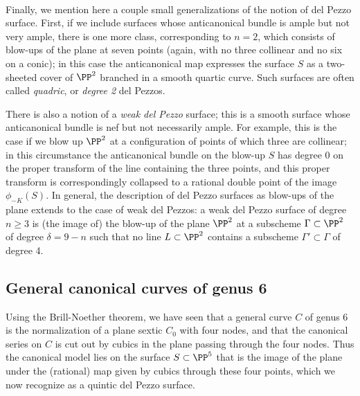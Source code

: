 \

Finally, we mention here a couple small generalizations of the notion of del Pezzo surface. First, if we include surfaces whose anticanonical bundle is ample but not very ample, there is one more class, corresponding to $n=2$, which consists of blow-ups of the plane at seven points (again, with no three collinear and no six on a conic); in this case the anticanonical map expresses the surface $S$ as a two-sheeted cover of $\PP^2$ branched in a smooth quartic curve. Such surfaces are often called \emph{quadric}, or \emph{degree 2} del Pezzos.


There is also a notion of a \emph{weak del Pezzo} surface; this is a smooth surface whose anticanonical bundle is nef but not necessarily ample. For example, this is the case if we blow up $\PP^2$ at a configuration of points of which three are collinear; in this circumstance the anticanonical bundle on the blow-up $S$ has degree 0 on the proper transform of the line containing the three points, and this proper transform is correspondingly collapsed to a rational double point of the image $\phi_{-K}(S)$. In general, the description of del Pezzo surfaces as blow-ups of the plane extends to the case of weak del Pezzos: a weak del Pezzo surface of degree $n \geq 3$ is (the image of) the blow-up of the plane $\PP^2$ at a subscheme $\Gamma \subset \PP^2$ of degree $\delta = 9 - n$ such that no line $L \subset \PP^2$ contains a subscheme $\Gamma' \subset \Gamma$ of degree 4.


\subsection{General canonical curves of genus 6}

Using the Brill-Noether theorem, we have seen that a general curve $C$ of genus 6 is the normalization of a plane sextic $C_0$ with four nodes, and that the canonical series on $C$ is cut out by cubics in the plane passing through the four nodes. Thus the canonical model lies on the surface $S \subset \PP^5$ that is the image of the plane under the (rational) map given by cubics through these four points, which we now recognize as a quintic del Pezzo surface.


